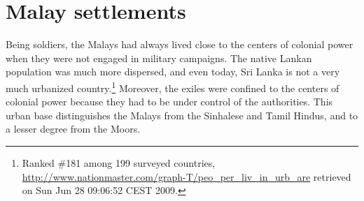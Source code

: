 


% 






\section{Malay settlements}\label{sec:slmbg:Malaysettlements}
Being soldiers, the Malays had always lived close to the centers of colonial power when they were not engaged in military campaigns. The native Lankan population was much more dispersed, and even today, Sri Lanka is not a very much urbanized country.\footnote{Ranked \#181 among 199 surveyed countries, \url{http://www.nationmaster.com/graph-T/peo_per_liv_in_urb_are} retrieved on Sun Jun 28 09:06:52 CEST 2009.} Moreover, the exiles were confined to the centers of colonial power because they had to be under control of the authorities. This urban base distinguishes the Malays from the Sinhalese and Tamil Hindus, and to a lesser degree from the Moors.

